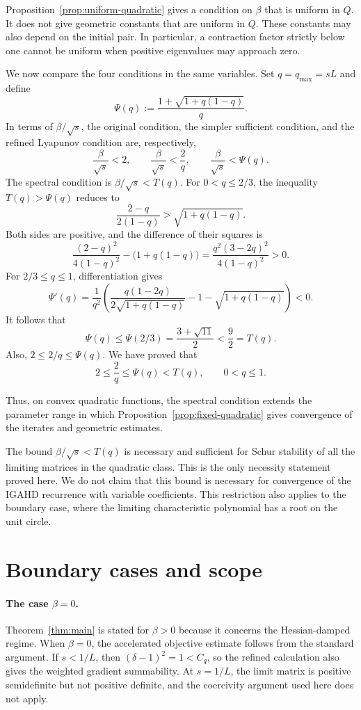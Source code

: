 \documentclass[11pt]{article}
\theoremstyle{plain}
\theoremstyle{definition}
\begin{document}
{Proposition~\ref{prop:uniform-quadratic} gives a condition on $\beta$ that is uniform in $Q$. It does not give geometric constants that are uniform in
$Q$. These constants may also depend on the initial pair. In particular, a contraction factor strictly below one cannot be uniform when positive
eigenvalues may approach zero.

We now compare the four conditions in the same variables. Set $q=q_{\max}=sL$ and define
$$
\Psi(q):=\frac{1+\sqrt{1+q(1-q)}}{q}.
$$
In terms of $\beta/\sqrt{s}$, the original condition, the simpler sufficient
condition, and the refined Lyapunov condition are, respectively,
$$
\frac{\beta}{\sqrt{s}}<2,
\qquad
\frac{\beta}{\sqrt{s}}<\frac{2}{q},
\qquad
\frac{\beta}{\sqrt{s}}<\Psi(q).
$$
The spectral condition is $\beta/\sqrt{s}<T(q)$. For $0<q\leq2/3$, the
inequality $T(q)>\Psi(q)$ reduces to
$$
\frac{2-q}{2(1-q)}>\sqrt{1+q(1-q)}.
$$
Both sides are positive, and the difference of their squares is
$$
\frac{(2-q)^2}{4(1-q)^2}-\bigl(1+q(1-q)\bigr)
=\frac{q^2(3-2q)^2}{4(1-q)^2}>0.
$$
For $2/3\leq q\leq1$, differentiation gives
$$
\Psi'(q)=\frac{1}{q^2}
\left(
\frac{q(1-2q)}{2\sqrt{1+q(1-q)}}
-1-\sqrt{1+q(1-q)}
\right)<0.
$$
It follows that
$$
\Psi(q)\leq\Psi(2/3)
=\frac{3+\sqrt{11}}{2}<\frac92=T(q).
$$
Also, $2\leq2/q\leq\Psi(q)$. We have proved that
$$
2\leq\frac2q\leq\Psi(q)<T(q),
\qquad 0<q\leq1.
$$

{Thus, on convex quadratic functions, the spectral condition
extends the parameter range in which Proposition~\ref{prop:fixed-quadratic}
gives convergence of the iterates and geometric estimates.}

The bound $\beta/\sqrt{s}<T(q)$ is necessary and sufficient for Schur
stability of all the limiting matrices in the quadratic class. This is the
only necessity statement proved here. We do not claim that this bound is
necessary for convergence of the IGAHD recurrence with variable coefficients.
This restriction also applies to the boundary case, where the limiting
characteristic polynomial has a root on the unit circle.
}
\section{Boundary cases and scope}\label{sec:scope}
\paragraph{The case $\beta=0$.}
Theorem~\ref{thm:main} is stated for $\beta>0$ because it concerns the
Hessian-damped regime. When $\beta=0$, the accelerated objective estimate
follows from the standard argument. If $s<1/L$, then
$(\delta-1)^2=1<C_q$, so the refined calculation also gives the weighted
gradient summability. At $s=1/L$, the limit matrix is positive semidefinite
but not positive definite, and the coercivity argument used here does not
apply.
\end{document}
